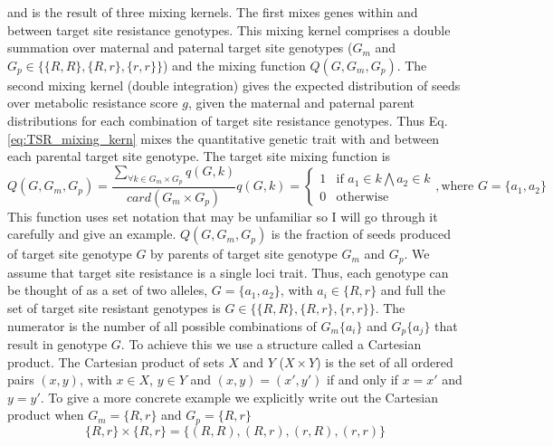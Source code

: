 \documentclass[10pt,letterpaper]{article}
\begin{document}
and is the result of three mixing kernels. The first mixes genes within and between target site resistance genotypes. This mixing kernel comprises a double summation over maternal and paternal target site genotypes ($G_m$ and $G_p \in \{\{R, R\}, \{R, r\}, \{r, r\} \}$) and the mixing function $Q(G, G_m, G_p)$. The second mixing kernel (double integration) gives the expected distribution of seeds over metabolic resistance score $g$, given the maternal and paternal parent distributions for each combination of target site resistance genotypes. Thus Eq. \ref{eq:TSR_mixing_kern} mixes the quantitative genetic trait with and between each parental target site genotype. The target site mixing function is
\begin{subequations}
\begin{equation}\label{eq:TSR_mixing_kern}
	Q(G, G_m, G_p) = \frac{\sum_{\forall k \in G_m \times G_p} q(G, k)}{card\left( G_m \times G_p \right)}
\end{equation}      
\begin{equation}\label{eq:allel_count}
	q(G, k) = \begin{cases}
		1 &\text{if } a_1 \in k \bigwedge a_2 \in k\\
		0 &\text{otherwise} 
	\end{cases}, \text{where } G = \{a_1, a_2\}
\end{equation} 
\end{subequations}
This function uses set notation that may be unfamiliar so I will go through it carefully and give an example. $Q(G, G_m, G_p)$ is the fraction of seeds produced of target site genotype $G$ by parents of target site genotype $G_m$ and $G_p$. We assume that target site resistance is a single loci trait. Thus, each genotype can be thought of as a set of two alleles, $G = \{a_1, a_2\}$, with $a_i \in \{R, r \}$ and full the set of target site resistant genotypes is $G \in \{\{R, R\}, \{R, r\}, \{r, r\} \}$. The numerator is the number of all possible combinations of $G_m\{a_i\}$ and $G_p\{a_j\}$ that result in genotype $G$. To achieve this we use a structure called a Cartesian product. The Cartesian product of sets $X$ and $Y$ ($X \times Y$) is the set of all ordered pairs $(x, y)$, with $x \in X$, $y \in Y$ and $(x, y) = (x', y')$ if and only if $x = x'$ and $y = y'$. To give a more concrete example we explicitly write out the Cartesian product when $G_m = \{R, r\}$ and $G_p = \{R, r\}$  
\begin{equation*}
	\{R, r\} \times \{R, r\} = \{(R, R), (R, r), (r, R), (r, r)\}
\end{equation*}
\end{document}
